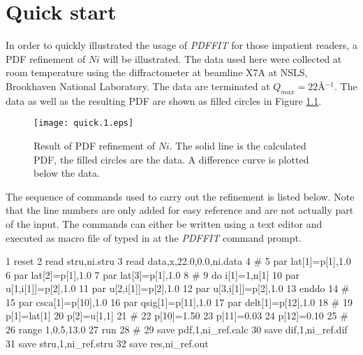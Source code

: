 
\chapter{Quick start \label{quick}}

In order to quickly illustrated the usage of {\it PDFFIT} for those
impatient readers, a PDF refinement of $Ni$ will be illustrated. The
data used here were collected at room temperature using the diffractometer
at beamline X7A at NSLS, Brookhaven National Laboratory. The data are
terminated at $Q_{max}=22$\AA$^{-1}$. The data as well as the resulting
PDF are shown as filled circles in Figure \ref{quick-fig1}.

\begin{figure}[!b]
   \centering
   \texttt{[image: quick.1.eps]}
   \caption[Result of PDF refinement of $Ni$]
           {Result of PDF refinement of $Ni$. The solid line is the
            calculated PDF, the filled circles are the data. A difference
            curve is plotted below the data.}
   \label{quick-fig1}
\end{figure}

The sequence of commands used to carry out the refinement is listed
below. Note that the line numbers are only added for easy reference and
are not actually part of the input. The commands can either be written
using a text editor and executed as macro file of typed in at the
{\it PDFFIT} command prompt.

\footnotesize
\begin{MacVerbatim}
      1 reset
      2 read stru,ni.stru
      3 read data,x,22.0,0.0,ni.data
      4 #
      5 par lat[1]=p[1],1.0
      6 par lat[2]=p[1],1.0
      7 par lat[3]=p[1],1.0
      8 #
      9 do i[1]=1,n[1]
     10   par u[1,i[1]]=p[2],1.0
     11   par u[2,i[1]]=p[2],1.0
     12   par u[3,i[1]]=p[2],1.0
     13 enddo
     14 #
     15 par csca[1]=p[10],1.0
     16 par qsig[1]=p[11],1.0
     17 par delt[1]=p[12],1.0
     18 #
     19 p[1]=lat[1]
     20 p[2]=u[1,1]
     21 #
     22 p[10]=1.50
     23 p[11]=0.03
     24 p[12]=0.10
     25 #
     26 range 1,0.5,13.0
     27 run
     28 #
     29 save pdf,1,ni_ref.calc
     30 save dif,1,ni_ref.dif
     31 save stru,1,ni_ref.stru
     32 save res,ni_ref.out
\end{MacVerbatim}
\normalsize

